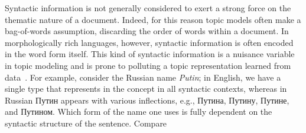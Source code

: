 \documentclass[11pt,letterpaper]{article}
\begin{document}
Syntactic information is not generally considered to exert a strong
force on the thematic nature of a document.  Indeed, for this reason
topic models often make a bag-of-words assumption, discarding the order
of words within a document.  In morphologically rich languages,
however, syntactic information is often encoded in the word form
itself.  This kind of syntactic information is a nuisance variable
in topic modeling and is prone to polluting a topic representation
learned from data~\cite{boydgraber2014}.
For example, consider the Russian name
{\em Putin}; in English, we have a single type that represents in the
concept in all syntactic contexts, whereas in Russian
{ Путин} appears with various inflections,
e.g., {Путина},
{Путину}, {Путине},
and {Путином}. Which form of the name one uses
is fully dependent on the syntactic structure of the sentence. Compare
\end{document}

